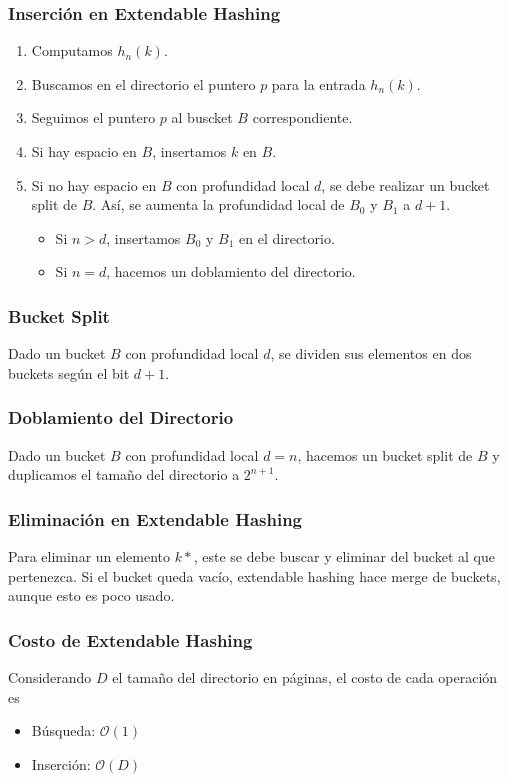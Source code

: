 \subsubsection{Inserción en Extendable Hashing}
\begin{enumerate}
  \item Computamos $h_n(k)$.
  \item Buscamos en el directorio el puntero $p$ para la entrada $h_n(k)$.
  \item Seguimos el puntero $p$ al buscket $B$ correspondiente.
  \item Si hay espacio en $B$, insertamos $k$ en $B$.
  \item Si no hay espacio en $B$ con profundidad local $d$, se debe realizar un bucket split de $B$. Así, se aumenta la profundidad local de $B_0$ y $B_1$ a $d+1$.
  \begin{itemize}
    \item Si $n>d$, insertamos $B_0$ y $B_1$ en el directorio.
    \item Si $n=d$, hacemos un doblamiento del directorio.
  \end{itemize}
\end{enumerate}

\subsubsection{Bucket Split}
Dado un bucket $B$ con profundidad local $d$, se dividen sus elementos en dos buckets según el bit $d+1$.

\subsubsection{Doblamiento del Directorio}
Dado un bucket $B$ con profundidad local $d=n$, hacemos un bucket split de $B$ y duplicamos el tamaño del directorio a $2^{n+1}$.

\subsubsection{Eliminación en Extendable Hashing}
Para eliminar un elemento $k*$, este se debe buscar y eliminar del bucket al que pertenezca. Si el bucket queda vacío, extendable hashing hace merge de buckets, aunque esto es poco usado.

\subsubsection{Costo de Extendable Hashing}
Considerando $D$ el tamaño del directorio en páginas, el costo de cada operación es
\begin{itemize}
  \item Búsqueda: $\mathcal{O}(1)$
  \item Inserción: $\mathcal{O}(D)$
\end{itemize}

